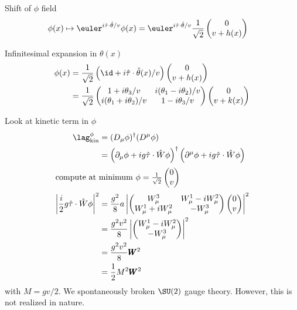 Shift of $\phi$ field
\begin{align}
   \phi(x) &\mapsto \euler^{i \hat{\tau} \cdot \hat{\theta} / v} \phi(x) = \euler^{i \hat{\tau} \cdot \hat{\theta} / v} \frac{1}{\sqrt{2}}  \begin{pmatrix} 0 \\ {v +h(x)} \end{pmatrix}
\end{align}

Infinitesimal expansion in $\theta(x)$
\begin{align*}
   \phi(x) &= \frac{1}{\sqrt{2}} \left( \id + i \hat{\tau} \cdot \hat{\theta}(x)/v \right) \begin{pmatrix} 0 \\ {v + h(x)}\end{pmatrix} \\
&= \frac{1}{\sqrt{2}} \begin{pmatrix} 1 + i\theta_3 /v & i(\theta_1 - i\theta_2)/v \\ i(\theta_1 + i\theta_2) / v & 1 - i\theta_3 /v \end{pmatrix} \begin{pmatrix} 0 \\ v + k(x)\end{pmatrix}
\end{align*}

Look at kinetic term in $\phi$
\begin{align*}
   \lag_{\text{kin}}^\phi &= (D_\mu \phi)^\dagger (D^\mu \phi) \\
                          &= \left( \partial_\mu \phi + i g \hat{\tau} \cdot \hat{W} \phi \right)^\dagger \left( \partial^\mu \phi + i g \hat{\tau} \cdot \hat{W} \phi \right) \\
                          \shortintertext{compute at minimum $\phi = \frac{1}{\sqrt{2}} \begin{pmatrix} 0 \\ v\end{pmatrix}$}
                          \left| \frac{i}{2} g \hat{\tau} \cdot \hat{W} \phi \right|^2 & = \frac{g^2}{8}a \left| \begin{pmatrix} W^3_\mu & W^1_\mu - i W_\mu^2 \\ W^1_\mu + i W_\mu^2 & -W_\mu^3 \end{pmatrix} \begin{pmatrix} 0 \\ v\end{pmatrix} \right|^2 \\
                         &= \frac{g^2 v^2}{8} \left| \begin{pmatrix} W_\mu^1 - iW_\mu^2 \\ -W_\mu^3\end{pmatrix} \right|^2 \\
                         &= \frac{g^2 v^2}{8} \pmb{W}^2 \\
                         &= \frac{1}{2} M^2 \pmb{W}^2
\end{align*}
with $M = gv/2$. We spontaneously broken $\SU(2)$ gauge theory. However, this is not realized in nature.
